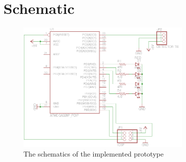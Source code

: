 \documentclass[a4paper]{article}
\begin{document}
    \section{Schematic}
    \begin{figure}[h]
        \centering
        \includegraphics[width=0.75\textwidth]{images/schematic}
        \caption{The schematics of the implemented prototype}
    \end{figure}
\end{document}
